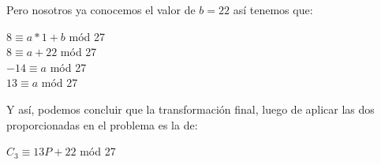 \documentclass[12pt]{article}
\begin{document}
Pero nosotros ya conocemos el valor de $b = 22$ así tenemos que: 

\begin{center}
    $8 \equiv a*1 + b$ mód 27 \\ 
    $8 \equiv a + 22$ mód 27 \\ 
    $-14 \equiv a$ mód 27 \\ 
    $13 \equiv a$ mód 27 \\ 
\end{center} 

Y así, podemos concluir que la transformación final, luego de aplicar las dos proporcionadas en el problema es la de:

\begin{center}
    $C_{3} \equiv 13P + 22$ mód 27
\end{center}
\end{document}
